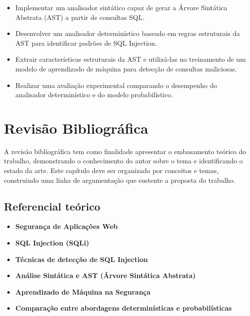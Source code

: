 \documentclass[
    12pt,                %
    openright,           %
    oneside,             %
    a4paper,             %
    english,             %
    brazil               %
]{abntex2}
\begin{document}
\begin{itemize}
    \item Implementar um analisador sintático capaz de gerar a Árvore Sintática Abstrata (AST) a partir de consultas SQL.  
    \item Desenvolver um analisador determinístico baseado em regras estruturais da AST para identificar padrões de SQL Injection.  
    \item Extrair características estruturais da AST e utilizá-las no treinamento de um modelo de aprendizado de máquina para detecção de consultas maliciosas.  
    \item Realizar uma avaliação experimental comparando o desempenho do analisador determinístico e do modelo probabilístico.  
\end{itemize}


\chapter{Revisão Bibliográfica}
\label{cap:revisao}

A revisão bibliográfica tem como finalidade apresentar o embasamento teórico do trabalho, demonstrando o conhecimento do autor sobre o tema e identificando o estado da arte. Este capítulo deve ser organizado por conceitos e temas, construindo uma linha de argumentação que sustente a proposta do trabalho.

\section{Referencial teórico}
\label{sec:referencial}

\begin{itemize}
    \item \textbf{Segurança de Aplicações Web }
    \item \textbf{SQL Injection (SQLi) }
    \item \textbf{Técnicas de detecção de SQL Injection }
    \item \textbf{Análise Sintática e AST (Árvore Sintática Abstrata) }
    \item \textbf{Aprendizado de Máquina na Segurança  }
    \item \textbf{Comparação entre abordagens determinísticas e probabilísticas}
\end{itemize}
\end{document}
